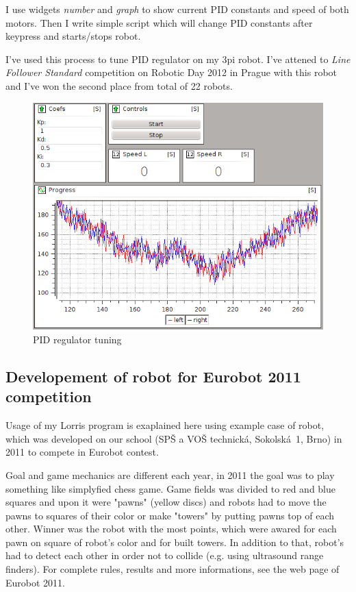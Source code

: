 \documentclass[12pt, a4paper, oneside]{article}
\newcommand{\It}{\textit}  %
\begin{document}
I use widgets \It{number} and \It{graph} to show current PID constants and speed of both motors. Then I write simple script which will change PID constants after keypress and starts/stops robot.

I've used this process to tune PID regulator on my 3pi\cite{3pi} robot. I've attened to \It{Line Follower Standard} competition on Robotic Day 2012 in Prague\cite{rob_den} with this robot and I've won the second place from total of 22 robots.

\begin{figure}[H]
\begin{center}
\includegraphics[scale=0.55]{img/use_pid.png}
\caption{PID regulator tuning}
\end{center}
\end{figure}

\newpage
\subsection{Developement of robot for Eurobot 2011 competition}
Usage of my Lorris program is exaplained here using example case of robot, which was developed on our school (SPŠ a VOŠ technická, Sokolská~1, Brno) in 2011 to compete in Eurobot contest.

Goal and game mechanics are different each year, in 2011 the goal was to play something like simplyfied chess game. Game fields was divided to red and blue squares and upon it were "pawns" (yellow discs) and robots had to move the pawns to squares of their color or make "towers" by putting pawns top of each other. Winner was the robot with the most points, which were awared for each pawn on square of robot's color and for built towers. In addition to that, robot's had to detect each other in order not to collide (e.g. using ultrasound range finders). For complete rules, results and more informations, see the web page of Eurobot 2011\cite{eurobot11}.
\end{document}
